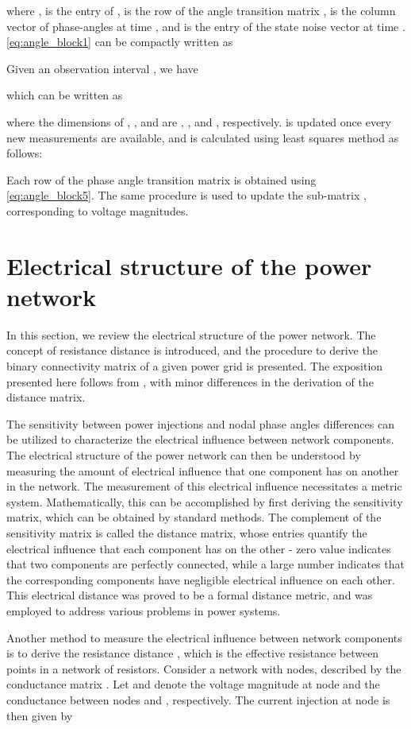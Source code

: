 \documentclass[10pt,journal,twocolumn]{IEEEtran}\IEEEoverridecommandlockouts
\begin{document}
where ,  is the  entry of ,  is the  row of the angle transition matrix ,  is the column vector of phase-angles at time , and  is the  entry of the state noise vector  at time . \eqref{eq:angle_block1} can be compactly written as

Given an observation interval , we have

which can be written as

where the dimensions of , ,  and  are , ,  and , respectively.  is updated once every new measurements are available, and is calculated using least squares method as follows:

Each row of the phase angle transition matrix is obtained using \eqref{eq:angle_block5}. The same procedure is used to update the sub-matrix , corresponding to voltage magnitudes.

\section{Electrical structure of the power network}\label{sec:elec_structure}
In this section, we review the electrical structure of the power network. The concept of resistance distance is introduced, and the procedure to derive the binary connectivity matrix of a given power grid is presented. The exposition presented here follows from \cite[Section III]{Cotilla-Sanchez2012}, with minor differences in the derivation of the distance matrix.

The sensitivity between power injections and nodal phase angles differences can be utilized to characterize the electrical influence between network components. The electrical structure of the power network can then be understood by measuring the amount of electrical influence that one component has on another in the network. The measurement of this electrical influence necessitates a metric system. Mathematically, this can be accomplished by first deriving the sensitivity matrix, which can be obtained by standard methods. The complement of the sensitivity matrix is called the distance matrix, whose entries quantify the electrical influence that each component has on the other - zero value indicates that two components are perfectly connected, while a large number indicates that the corresponding components have negligible electrical influence on each other. This electrical distance was proved to be a formal distance metric, and was employed to address various problems in power systems.

Another method to measure the electrical influence between network components is to derive the resistance distance \cite{Klein1993}, which is the effective resistance between points in a network of resistors. Consider a network with  nodes, described by the conductance matrix . Let  and  denote the voltage magnitude at node  and the conductance between nodes  and , respectively. The current injection at node  is then given by
\end{document}
